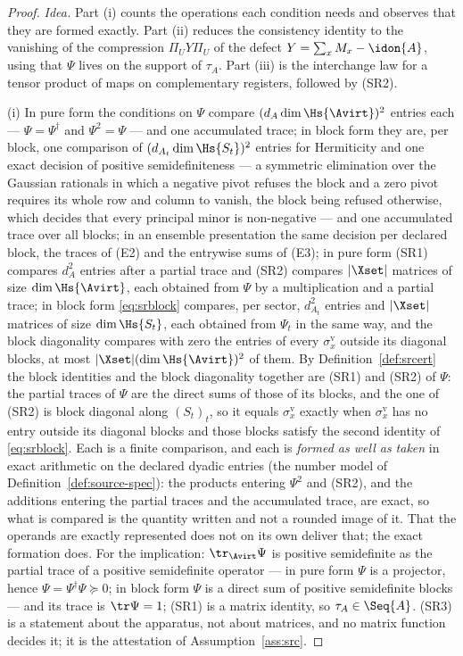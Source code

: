 \begin{proof}
\emph{Idea.} Part (i) counts the operations each condition needs and
observes that they are formed exactly. Part (ii) reduces the consistency
identity to the vanishing of the compression $\Pi_UY\Pi_U$ of the defect
$Y=\sum_xM_x-\idon{A}$, using that $\Psi$ lives on the support of $\tau_A$.
Part (iii) is the interchange law for a tensor product of maps on
complementary registers, followed by (SR2).

(i) In pure form the conditions on $\Psi$ compare $(d_A\dim\Hs{\Avirt})^2$
entries each --- $\Psi=\Psi^{\dagger}$ and $\Psi^2=\Psi$ --- and one
accumulated trace; in block form they are, per block, one comparison of
$(d_{A_t}\dim\Hs{S_t})^2$ entries for Hermiticity and one exact decision of
positive semidefiniteness --- a symmetric elimination over the Gaussian
rationals in which a negative pivot refuses the block and a zero pivot
requires its whole row and column to vanish, the block being refused
otherwise, which decides that every principal minor is non-negative --- and
one accumulated trace over all blocks; in an ensemble presentation the same
decision per declared block, the traces of (E2) and the entrywise sums of
(E3); in pure form (SR1) compares $d_A^2$ entries after a partial trace and
(SR2) compares $|\Xset|$ matrices of size $\dim\Hs{\Avirt}$, each obtained
from $\Psi$ by a multiplication and a partial trace; in block form
\eqref{eq:srblock} compares, per sector, $d_{A_t}^2$ entries and $|\Xset|$
matrices of size $\dim\Hs{S_t}$, each obtained from $\Psi_t$ in the same way,
and the block diagonality compares with zero the entries of every
$\sigma^{\mathrm v}_x$ outside its diagonal blocks, at most
$|\Xset|(\dim\Hs{\Avirt})^2$ of them. By Definition~\ref{def:srcert} the block
identities and the block diagonality together are (SR1) and (SR2) of $\Psi$:
the partial traces of $\Psi$ are the direct sums of those of its blocks, and
the one of (SR2) is block diagonal along $(S_t)_t$, so it equals
$\sigma^{\mathrm v}_x$ exactly when $\sigma^{\mathrm v}_x$ has no entry
outside its diagonal blocks and those blocks satisfy the second identity of
\eqref{eq:srblock}. Each is a finite comparison, and each
is \emph{formed as well as taken} in exact arithmetic on the declared
dyadic entries (the number model of Definition~\ref{def:source-spec}): the
products entering $\Psi^2$ and (SR2), and the additions entering the
partial traces and the accumulated trace, are exact, so what is compared is
the quantity written and not a rounded image of it. That the operands are
exactly represented does not on its own deliver that; the exact formation
does. For the implication: $\tr_{\Avirt}\Psi$ is positive semidefinite as
the partial trace of a positive semidefinite operator --- in pure form
$\Psi$ is a projector, hence $\Psi=\Psi^{\dagger}\Psi\succeq0$; in block
form $\Psi$ is a direct sum of positive semidefinite blocks --- and its
trace is $\tr\Psi=1$; (SR1) is a matrix identity, so $\tau_A\in\Seq{A}$.
(SR3) is a statement about the apparatus, not about matrices, and no matrix
function decides it; it is the attestation of Assumption~\ref{ass:src}.


\end{proof}
